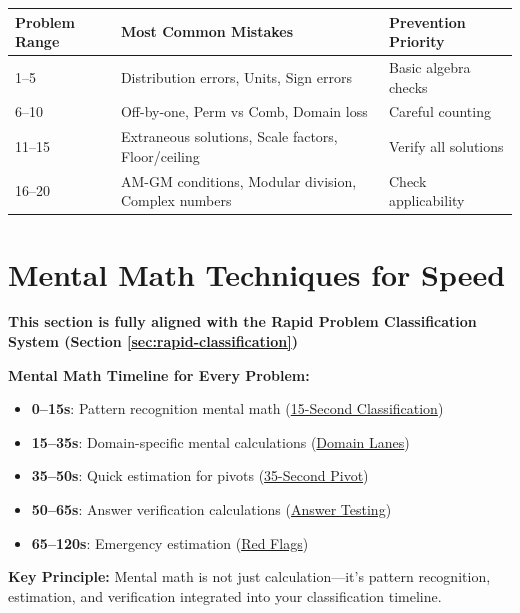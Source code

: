 \documentclass{article}
\begin{document}
\begin{tcolorbox}[colback=green!5!white,colframe=green!75!black,title={\textbf{Quick Reference Table: Problem Number to Common Mistakes}}]
\begin{center}
\begin{tabular}{|l|l|l|}
\hline
\textbf{Problem Range} & \textbf{Most Common Mistakes} & \textbf{Prevention Priority} \\
\hline
1--5 & Distribution errors, Units, Sign errors & Basic algebra checks \\
6--10 & Off-by-one, Perm vs Comb, Domain loss & Careful counting \\
11--15 & Extraneous solutions, Scale factors, Floor/ceiling & Verify all solutions \\
16--20 & AM-GM conditions, Modular division, Complex numbers & Check applicability \\
\hline
\end{tabular}
\end{center}
\end{tcolorbox}

\newpage

\section{Mental Math Techniques for Speed}

\begin{tcolorbox}[colback=yellow!10!white,colframe=orange!75!black,title={\textbf{Integration with Rapid Classification Timeline}}]
\textbf{This section is fully aligned with the Rapid Problem Classification System (Section \ref{sec:rapid-classification})}

\textbf{Mental Math Timeline for Every Problem:}
\begin{itemize}[nosep]
\item \textbf{0--15s}: Pattern recognition mental math (\hyperlink{classify-15}{15-Second Classification})
\item \textbf{15--35s}: Domain-specific mental calculations (\hyperlink{domain-lanes}{Domain Lanes})
\item \textbf{35--50s}: Quick estimation for pivots (\hyperlink{pivot35}{35-Second Pivot})
\item \textbf{50--65s}: Answer verification calculations (\hyperlink{answer-test-50}{Answer Testing})
\item \textbf{65--120s}: Emergency estimation (\hyperlink{redflags}{Red Flags})
\end{itemize}

\textbf{Key Principle:} Mental math is not just calculation—it's pattern recognition, estimation, and verification integrated into your classification timeline.
\end{tcolorbox}
\end{document}
